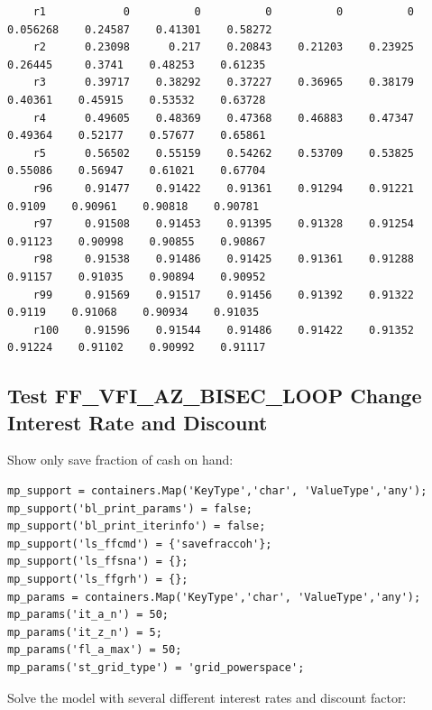\documentclass[
]{book}
\begin{document}
\begin{verbatim}
    r1            0          0          0          0          0    0.056268    0.24587    0.41301    0.58272
    r2      0.23098      0.217    0.20843    0.21203    0.23925     0.26445     0.3741    0.48253    0.61235
    r3      0.39717    0.38292    0.37227    0.36965    0.38179     0.40361    0.45915    0.53532    0.63728
    r4      0.49605    0.48369    0.47368    0.46883    0.47347     0.49364    0.52177    0.57677    0.65861
    r5      0.56502    0.55159    0.54262    0.53709    0.53825     0.55086    0.56947    0.61021    0.67704
    r96     0.91477    0.91422    0.91361    0.91294    0.91221      0.9109    0.90961    0.90818    0.90781
    r97     0.91508    0.91453    0.91395    0.91328    0.91254     0.91123    0.90998    0.90855    0.90867
    r98     0.91538    0.91486    0.91425    0.91361    0.91288     0.91157    0.91035    0.90894    0.90952
    r99     0.91569    0.91517    0.91456    0.91392    0.91322      0.9119    0.91068    0.90934    0.91035
    r100    0.91596    0.91544    0.91486    0.91422    0.91352     0.91224    0.91102    0.90992    0.91117
\end{verbatim}

\hypertarget{test-ff_vfi_az_bisec_loop-change-interest-rate-and-discount}{%
\subsection{Test FF\_VFI\_AZ\_BISEC\_LOOP Change Interest Rate and Discount}\label{test-ff_vfi_az_bisec_loop-change-interest-rate-and-discount}}

Show only save fraction of cash on hand:

\begin{verbatim}
mp_support = containers.Map('KeyType','char', 'ValueType','any');
mp_support('bl_print_params') = false;
mp_support('bl_print_iterinfo') = false;
mp_support('ls_ffcmd') = {'savefraccoh'};
mp_support('ls_ffsna') = {};
mp_support('ls_ffgrh') = {};
mp_params = containers.Map('KeyType','char', 'ValueType','any');
mp_params('it_a_n') = 50;
mp_params('it_z_n') = 5;
mp_params('fl_a_max') = 50;
mp_params('st_grid_type') = 'grid_powerspace';
\end{verbatim}

Solve the model with several different interest rates and discount
factor:
\end{document}
